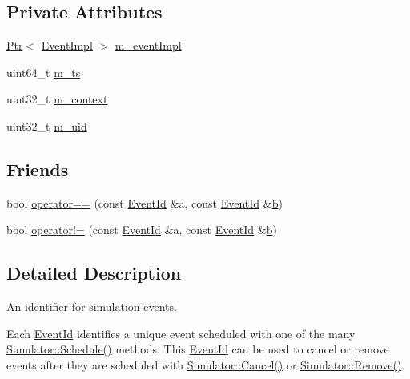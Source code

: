 \subsection*{Private Attributes}
\begin{DoxyCompactItemize}
\item 
\hyperlink{classns3_1_1Ptr}{Ptr}$<$ \hyperlink{classns3_1_1EventImpl}{Event\+Impl} $>$ \hyperlink{classns3_1_1EventId_aedc50b4a5bc760d6b3f6842ff4f48f52}{m\+\_\+event\+Impl}
\item 
uint64\+\_\+t \hyperlink{classns3_1_1EventId_a56cb2ce4649140a91c0cb7bd7f30e736}{m\+\_\+ts}
\item 
uint32\+\_\+t \hyperlink{classns3_1_1EventId_ae865f27ce48282dea263d903765ebc9a}{m\+\_\+context}
\item 
uint32\+\_\+t \hyperlink{classns3_1_1EventId_a727974e1212742906af68bca5301db5c}{m\+\_\+uid}
\end{DoxyCompactItemize}
\subsection*{Friends}
\begin{DoxyCompactItemize}
\item 
bool \hyperlink{classns3_1_1EventId_a51ae51b0d70dbed2b94940a6eb7061d4}{operator==} (const \hyperlink{classns3_1_1EventId}{Event\+Id} \&a, const \hyperlink{classns3_1_1EventId}{Event\+Id} \&\hyperlink{lte__pathloss_8m_a21ad0bd836b90d08f4cf640b4c298e7c}{b})
\item 
bool \hyperlink{classns3_1_1EventId_a174b038df5fa1503d923f864f4416ba1}{operator!=} (const \hyperlink{classns3_1_1EventId}{Event\+Id} \&a, const \hyperlink{classns3_1_1EventId}{Event\+Id} \&\hyperlink{lte__pathloss_8m_a21ad0bd836b90d08f4cf640b4c298e7c}{b})
\end{DoxyCompactItemize}


\subsection{Detailed Description}
An identifier for simulation events. 

Each \hyperlink{classns3_1_1EventId}{Event\+Id} identifies a unique event scheduled with one of the many \hyperlink{classns3_1_1Simulator_a671882c894a08af4a5e91181bf1eec13}{Simulator\+::\+Schedule()} methods. This \hyperlink{classns3_1_1EventId}{Event\+Id} can be used to cancel or remove events after they are scheduled with \hyperlink{classns3_1_1Simulator_a1b903a62d6117ef28f7ba3c6500689bf}{Simulator\+::\+Cancel()} or \hyperlink{classns3_1_1Simulator_ae30cacdda6cd0d5d62a8f2097b320506}{Simulator\+::\+Remove()}.

